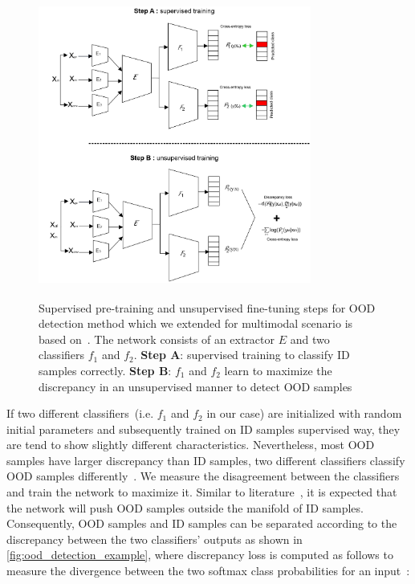 \begin{figure}[htp!]
    \centering
    \includegraphics[width=0.8\textwidth,height=100mm]{images/OOD_1.png}
    \caption[Supervised pre-training and unsupervised fine-tuning steps for OOD detection.]{Supervised pre-training and unsupervised fine-tuning steps for OOD detection method which we extended for multimodal scenario is based on~\cite{yu2019unsupervised}. The network consists of an extractor $E$ and two classifiers $f_{1}$ and $f_{2}$. \textbf{Step A}: supervised training to classify ID samples correctly. \textbf{Step B}: $f_{1}$ and $f_{2}$ learn to maximize the discrepancy in an unsupervised manner to detect OOD samples}
    \label{fig:ood_network}
    \vspace{-2mm}
\end{figure}

\hspace*{3.5mm} If two different classifiers~(i.e. $f_{1}$ and $f_{2}$ in our case) are initialized with random initial parameters and subsequently trained on ID samples supervised way, they are tend to show slightly different characteristics. Nevertheless, most OOD samples have larger discrepancy than ID samples, two different classifiers classify OOD samples differently~\cite{OOD19}. 
We measure the disagreement between the classifiers and train the network to maximize it. Similar to literature~\cite{OOD19}, it is expected that the network will push OOD samples outside the manifold of ID samples. Consequently, OOD samples and ID samples can be separated according to the discrepancy between the two classifiers’ outputs as shown in \cref{fig:ood_detection_example}, where discrepancy loss is computed as follows to measure the divergence between the two softmax class probabilities for an input~\cite{OOD19}: 

